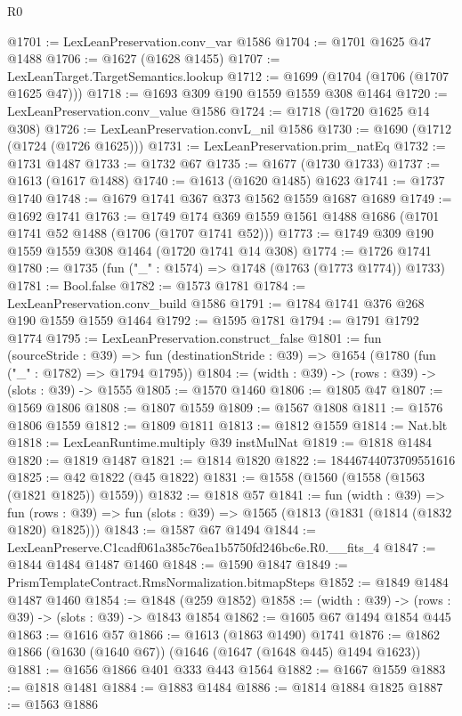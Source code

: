 \begin{lexlean}{R0}
\begin{coremodule}
@1701 := LexLeanPreservation.conv_var @1586
@1704 := @1701 @1625 @47 @1488
@1706 := @1627 (@1628 @1455)
@1707 := LexLeanTarget.TargetSemantics.lookup
@1712 := @1699 (@1704 (@1706 (@1707 @1625 @47)))
@1718 := @1693 @309 @190 @1559 @1559 @308 @1464
@1720 := LexLeanPreservation.conv_value @1586
@1724 := @1718 (@1720 @1625 @14 @308)
@1726 := LexLeanPreservation.convL_nil @1586
@1730 := @1690 (@1712 (@1724 (@1726 @1625)))
@1731 := LexLeanPreservation.prim_natEq
@1732 := @1731 @1487
@1733 := @1732 @67
@1735 := @1677 (@1730 @1733)
@1737 := @1613 (@1617 @1488)
@1740 := @1613 (@1620 @1485) @1623
@1741 := @1737 @1740
@1748 := @1679 @1741 @367 @373 @1562 @1559 @1687 @1689
@1749 := @1692 @1741
@1763 := @1749 @174 @369 @1559 @1561 @1488 @1686 (@1701 @1741 @52 @1488 (@1706 (@1707 @1741 @52)))
@1773 := @1749 @309 @190 @1559 @1559 @308 @1464 (@1720 @1741 @14 @308)
@1774 := @1726 @1741
@1780 := @1735 (fun ("_" : @1574) => @1748 (@1763 (@1773 @1774)) @1733)
@1781 := Bool.false
@1782 := @1573 @1781
@1784 := LexLeanPreservation.conv_build @1586
@1791 := @1784 @1741 @376 @268 @190 @1559 @1559 @1464
@1792 := @1595 @1781
@1794 := @1791 @1792 @1774
@1795 := LexLeanPreservation.construct_false
@1801 := fun (sourceStride : @39) =>
  fun (destinationStride : @39) => @1654 (@1780 (fun ("_" : @1782) => @1794 @1795))
@1804 := (width : @39) -> (rows : @39) -> (slots : @39) -> @1555
@1805 := @1570 @1460
@1806 := @1805 @47
@1807 := @1569 @1806
@1808 := @1807 @1559
@1809 := @1567 @1808
@1811 := @1576 @1806 @1559
@1812 := @1809 @1811
@1813 := @1812 @1559
@1814 := Nat.blt
@1818 := LexLeanRuntime.multiply @39 instMulNat
@1819 := @1818 @1484
@1820 := @1819 @1487
@1821 := @1814 @1820
@1822 := 18446744073709551616
@1825 := @42 @1822 (@45 @1822)
@1831 := @1558 (@1560 (@1558 (@1563 (@1821 @1825)) @1559))
@1832 := @1818 @57
@1841 := fun (width : @39) =>
  fun (rows : @39) => fun (slots : @39) => @1565 (@1813 (@1831 (@1814 (@1832 @1820) @1825)))
@1843 := @1587 @67 @1494
@1844 := LexLeanPreserve.C1cadf061a385c76ea1b5750fd246bc6e.R0.__fits_4
@1847 := @1844 @1484 @1487 @1460
@1848 := @1590 @1847
@1849 := PrismTemplateContract.RmsNormalization.bitmapSteps
@1852 := @1849 @1484 @1487 @1460
@1854 := @1848 (@259 @1852)
@1858 := (width : @39) -> (rows : @39) -> (slots : @39) -> @1843 @1854
@1862 := @1605 @67 @1494 @1854 @445
@1863 := @1616 @57
@1866 := @1613 (@1863 @1490) @1741
@1876 := @1862 @1866 (@1630 (@1640 @67)) (@1646 (@1647 (@1648 @445) @1494 @1623))
@1881 := @1656 @1866 @401 @333 @443 @1564
@1882 := @1667 @1559
@1883 := @1818 @1481
@1884 := @1883 @1484
@1886 := @1814 @1884 @1825
@1887 := @1563 @1886

\end{coremodule}
\end{lexlean}
